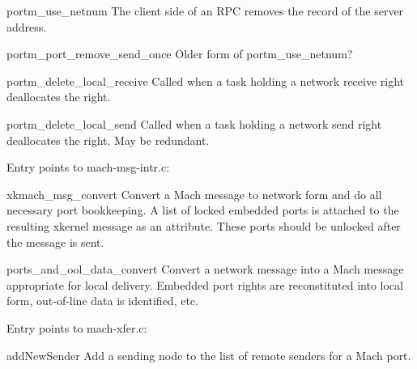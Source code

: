\begin{description}
\item {portm\_use\_netnum}
The client side of an RPC removes the record of the server address.

\item {portm\_port\_remove\_send\_once}
Older form of portm\_use\_netnum?

\item {portm\_delete\_local\_receive}
Called when a task holding a network receive right deallocates the right.

\item {portm\_delete\_local\_send}
Called when a task holding a network send right deallocates the right.
May be redundant.

\end{description}

Entry points to mach-msg-intr.c:
\begin{description}
\item {xkmach\_msg\_convert}
Convert a Mach message to network form and do all necessary port bookkeeping.
A list of locked embedded ports is attached to the resulting xkernel message
as an attribute.  These ports should be unlocked after the message is sent.

\item {ports\_and\_ool\_data\_convert}
Convert a network message into a Mach message appropriate for local delivery.
Embedded port rights are reconstituted into local form, out-of-line data
is identified, etc.
\end{description}

Entry points to mach-xfer.c:
\begin{description}
\item {addNewSender}
Add a sending node to the list of remote senders for a Mach port.

\end{description}



